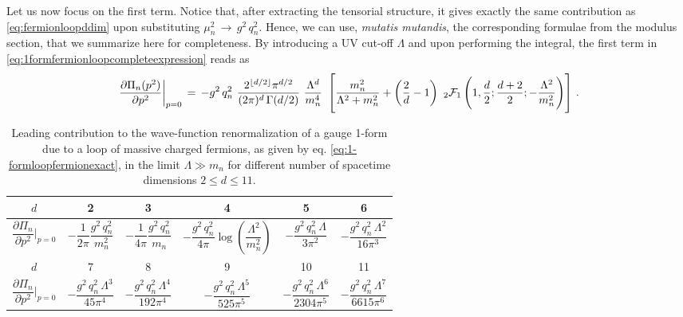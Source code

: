 Let us now focus on the first term. Notice that, after extracting the tensorial structure, it gives exactly the same contribution as \eqref{eq:fermionloopddim} upon substituting $\mu_n^2 \,  \to \,  g^2 \, q_n^2$. Hence, we can use, \emph{mutatis mutandis}, the corresponding formulae from the modulus section, that we summarize here for completeness. By introducing a UV cut-off $\Lambda$ and upon performing the integral, the first term in \eqref{eq:1formfermionloopcompleteexpression} reads as
%
\begin{equation}
			\frac{\partial \Pi_n(p^2)}{\partial p^2} \bigg\rvert_{p=0}  \, =  \, - g^2\, q_n^2  \ \frac{ \fdim \pi^{d/2}  }{  (2 \pi)^d \, \Gamma(d/2) } \ \frac{\Lambda^d}{m_n^4} \  \left[  \frac{m_n^2}{\Lambda^2+m_n^2}  + \left(\frac{2}{d}-1\right) \ _2{\cal F}_1\left( 1,\frac{d}{2};\frac{d+2}{2}; -\frac{\Lambda^2}{m_n^2}\right) \right]  \, .
\label{eq:1-formloopfermionexact}
\end{equation}
%
%
		\begin{table}[t]\begin{center}
				\renewcommand{\arraystretch}{2.00}
				\begin{tabular}{|c||c|c|c|c|c|}
					\hline
					$d$ & 2 & 3 & 4 & 5 & 6 \\
					\hline 
					$\dfrac {\partial \Pi_n}{\partial p^2} \bigg\rvert_{p=0}$ &
					$-\dfrac{1}{2 \pi}\dfrac{g^2\, q_n^2}{m_n^2}$ & 
					$ -\dfrac{1}{4 \pi  }\dfrac{g^2\, q_n^2}{m_n}$ &
					$ -\dfrac{g^2\, q_n^2 }{4 \pi } \log \left(\dfrac{\Lambda ^2}{m_n^2}\right)$ & 
					$ -\dfrac{g^2\, q_n^2  \, \Lambda }{3 \pi^2}$ &
					$ -\dfrac{g^2\, q_n^2  \, \Lambda^2 }{16 \pi^3} $ \\
					\hline 
					\hline
					$d$ &  7 & 8 & 9 & 10 & 11\\
					\hline 
					$\dfrac {\partial \Pi_n}{\partial p^2} \bigg\rvert_{p=0}$ &
					$  -\dfrac{g^2\, q_n^2  \, \Lambda^3 }{45 \pi^4}  $ &
					$-\dfrac{g^2\, q_n^2  \, \Lambda^4  }{192 \pi^4} $ &
					$ -\dfrac{g^2\, q_n^2  \, \Lambda^5  }{525 \pi^5}$ &
					$ -\dfrac{g^2\, q_n^2  \, \Lambda^6   }{2304 \pi^5}$ &
					$  -\dfrac{g^2\, q_n^2  \, \Lambda^7 }{6615 \pi^6} $  \\
					\hline
				\end{tabular}
				\caption{Leading contribution to the wave-function renormalization of a gauge 1-form due to a loop of massive charged fermions, as given by eq. \eqref{eq:1-formloopfermionexact}, in the limit $\Lambda\gg m_n$ for different number of spacetime dimensions $2 \leq d \leq 11$.}
				\label{tab:1-formloopfermionLambda>>m}\end{center}
		\end{table}  
